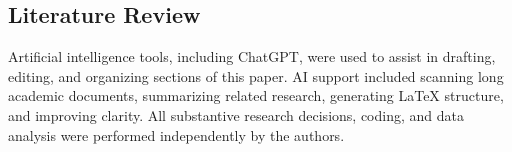 \subsection{Literature Review}

Artificial intelligence tools, including ChatGPT, were used to assist in drafting, editing, and organizing sections of this paper. AI support included scanning long academic documents, summarizing related research, generating LaTeX structure, and improving clarity. All substantive research decisions, coding, and data analysis were performed independently by the authors.
